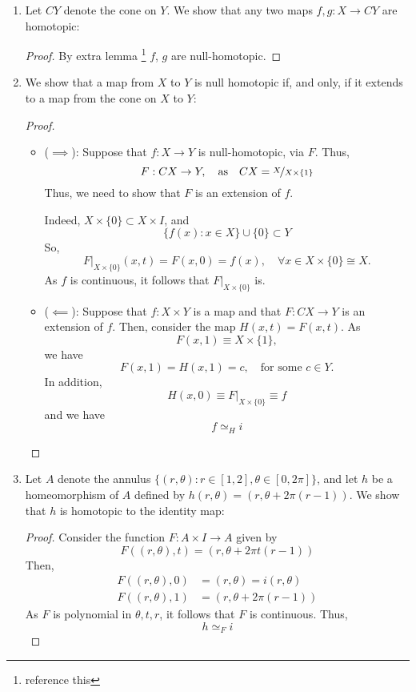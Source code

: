 \documentclass{book}
\begin{document}
\begin{enumerate}[(1)]
    \item Let $CY$ denote the cone on $Y$. We show that any two maps $f,g: X \rightarrow CY$ are homotopic: 
        \begin{proof} By extra lemma \footnote{reference  this} $f$, $g$ are null-homotopic. 
        \end{proof}

    \item We show that a map from $X$ to $Y$  is null homotopic if, and only, if it extends to a map from the cone on $X$ to $Y$: 
        \begin{proof}
            \begin{itemize}
                \item[] ($\implies$): Suppose that $f: X \rightarrow Y$ is null-homotopic, via $F$. Thus, 
                    \[F: CX \rightarrow Y, \quad \text{as} \quad CX = \nicefrac{X}{X \times \{1\}}\]
                    Thus, we need to show that $F$ is an extension of $f$. 
                    \par Indeed, $X \times \{0\} \subset X \times I$, and 
                    \[\{f(x) : x \in X\} \cup \{0\} \subset Y\]
                    So, 
                    \[F|_{X \times \{0\}} (x,t) = F(x,0) = f(x), \quad \forall x \in X \times \{0\} \cong X.\]
                    As $f$ is continuous, it follows that $F|_{X \times \{0\}}$ is. 

                \item[] ($\impliedby$): Suppose that $f: X \times Y$ is a map and that $F:CX \rightarrow Y$ is an extension of $f$. Then, consider the map $H(x,t) = F(x,t)$. As 
                    \[F(x,1) \equiv X \times \{1\},\]
                    we have 
                    \[F(x,1) = H(x,1) = c, \quad \text{for some } c \in Y.\]
                    In addition, 
                    \[H(x,0) \equiv F|_{X \times \{0\}} \equiv f \]
                    and we have 
                    \[f \simeq_H i\]
            \end{itemize}


        \end{proof}

    \item Let $A$ denote the annulus $\{(r,\theta) : r \in [1,2], \theta \in [0,2\pi]\}$, and let $h$ be a homeomorphism of $A$ defined by $h(r, \theta) = (r, \theta + 2\pi(r-1))$. We show that $h$ is homotopic to the identity map:
        \begin{proof} Consider the function $F: A \times I \rightarrow A$ given by 
            \[F((r,\theta) , t) = (r, \theta + 2\pi t(r-1))\]
            Then, 
            \begin{align*}
                F((r,\theta), 0 ) & = (r, \theta) = i(r, \theta) \\
                F((r, \theta), 1) & = (r, \theta + 2 \pi (r  - 1)) 
            \end{align*}
            As $F$ is polynomial in $\theta, t, r$, it follows that $F$ is continuous. Thus, 
            \[h \simeq_F i\]
        \end{proof}

\end{enumerate}
\end{document}
